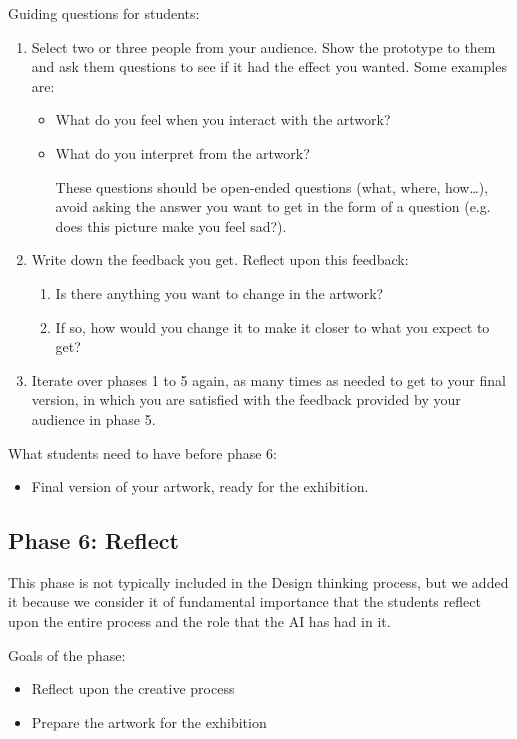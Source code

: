 \documentclass[12pt]{article}
\newcounter{question}
\begin{document}
Guiding questions for students: 
\begin{enumerate}
\item Select two or three people from your audience. Show the prototype to them and ask them questions to see if it had the effect you wanted. Some examples are:
\begin{itemize}
\item What do you feel when you interact with the artwork?
\item What do you interpret from the artwork?

These questions should be open-ended questions (what, where, how…), avoid asking the answer you want to get in the form of a question (e.g. does this picture make you feel sad?).
\end{itemize}
\item Write down the feedback you get. Reflect upon this feedback:
    \begin{enumerate}
    \item Is there anything you want to change in the artwork?
    \item If so, how would you change it to make it closer to what you expect to get?
    
    \end{enumerate}

\item Iterate over phases 1 to 5 again, as many times as needed to get to your final version, in which you are satisfied with the feedback provided by your audience in phase 5.

\end{enumerate}

What students need to have before phase 6:
\begin{itemize}
\item Final version of your artwork, ready for the exhibition.
\end{itemize}


\subsection{Phase 6: Reflect}

This phase is not typically included in the Design thinking process, but we added it because we consider it of fundamental importance that the students reflect upon the entire process and the role that the AI has had in it.

\vspace{0.3cm}
Goals of the phase: 
\begin{itemize}
\item Reflect upon the creative process
\item Prepare the artwork for the exhibition
\end{itemize}
\end{document}
